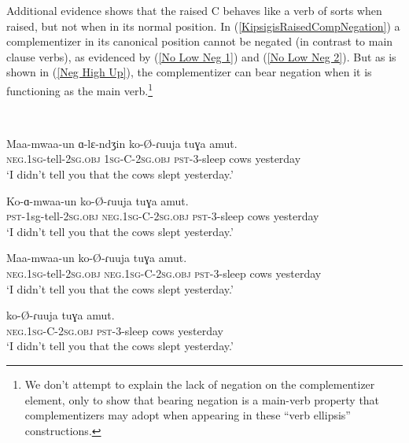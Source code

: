 \documentclass[output=paper
,modfonts
,nonflat
]{langsci/langscibook}
\begin{document}
Additional evidence shows that the raised C behaves like a verb of sorts when raised, but not when in its normal position. In (\ref{KipsigisRaisedCompNegation}) a complementizer in its canonical position cannot be negated (in contrast to main clause verbs), as evidenced by (\ref{No Low Neg 1}) and (\ref{No Low Neg 2}). But as is shown in (\ref{Neg High Up}), the complementizer can bear negation when it is functioning as the main verb.\footnote{We don't attempt to explain the lack of negation on the complementizer element, only to show that bearing negation is a main-verb property that complementizers may adopt when appearing in these ``verb ellipsis'' constructions.} 

\ea \label{KipsigisRaisedCompNegation}
\\
\begin{xlist}

\ex \label{Neg on Verb} 
\gll Maa-mwaa-un ɑ-lɛ-ndʒin ko-\O-ɾuuja tuɣa amut. \\
\textsc{neg}.1\textsc{sg}-tell-2\textsc{sg}.\textsc{obj} 1\textsc{sg}-C-2\textsc{sg}.\textsc{obj} \textsc{pst}-3-sleep cows yesterday \\
\glt `I didn't tell you that the cows slept yesterday.'

\ex \label{No Low Neg 1}
\gll *Ko-ɑ-mwaa-un  ko-\O-ɾuuja tuɣa amut. \\
\textsc{pst}-1sg-tell-2\textsc{sg}.\textsc{obj} \textsc{neg}.1\textsc{sg}-C-2\textsc{sg}.\textsc{obj} \textsc{pst}-3-sleep cows yesterday \\
\glt `I didn't tell you that the cows slept yesterday.'

\ex \label{No Low Neg 2}
\gll *Maa-mwaa-un  ko-\O-ɾuuja tuɣa amut. \\
\textsc{neg}.1\textsc{sg}-tell-2\textsc{sg}.\textsc{obj} \textsc{neg}.1\textsc{sg}-C-2\textsc{sg}.\textsc{obj} \textsc{pst}-3-sleep cows yesterday \\
\glt `I didn't tell you that the cows slept yesterday.'

\ex \label{Neg High Up}
\gll {} ko-\O-ɾuuja tuɣa amut. \\
\textsc{neg}.1\textsc{sg}-C-2\textsc{sg}.\textsc{obj} \textsc{pst}-3-sleep cows yesterday \\
\glt `I didn't tell you that the cows slept yesterday.'

\end{xlist} 
\z
\end{document}

